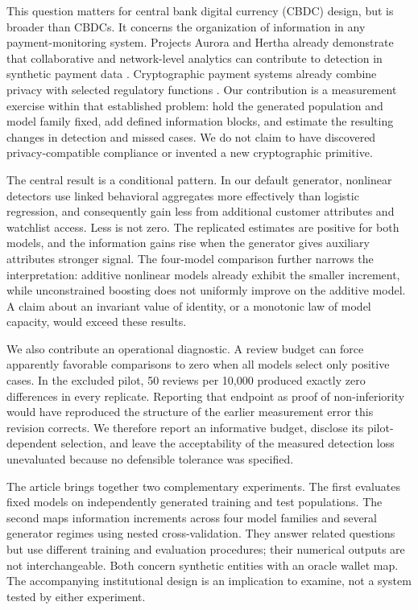 \documentclass[11pt,a4paper]{article}
\begin{document}
This question matters for central bank digital currency (CBDC) design, but is broader than CBDCs. It concerns the organization of information in any payment-monitoring system. Projects Aurora and Hertha already demonstrate that collaborative and network-level analytics can contribute to detection in synthetic payment data \citep{Aurora,Hertha}. Cryptographic payment systems already combine privacy with selected regulatory functions \citep{Platypus,PEReDi,Pools}. Our contribution is a measurement exercise within that established problem: hold the generated population and model family fixed, add defined information blocks, and estimate the resulting changes in detection and missed cases. We do not claim to have discovered privacy-compatible compliance or invented a new cryptographic primitive.

The central result is a conditional pattern. In our default generator, nonlinear detectors use linked behavioral aggregates more effectively than logistic regression, and consequently gain less from additional customer attributes and watchlist access. Less is not zero. The replicated estimates are positive for both models, and the information gains rise when the generator gives auxiliary attributes stronger signal. The four-model comparison further narrows the interpretation: additive nonlinear models already exhibit the smaller increment, while unconstrained boosting does not uniformly improve on the additive model. A claim about an invariant value of identity, or a monotonic law of model capacity, would exceed these results.

We also contribute an operational diagnostic. A review budget can force apparently favorable comparisons to zero when all models select only positive cases. In the excluded pilot, 50 reviews per 10,000 produced exactly zero differences in every replicate. Reporting that endpoint as proof of non-inferiority would have reproduced the structure of the earlier measurement error this revision corrects. We therefore report an informative budget, disclose its pilot-dependent selection, and leave the acceptability of the measured detection loss unevaluated because no defensible tolerance was specified.

The article brings together two complementary experiments. The first evaluates fixed models on independently generated training and test populations. The second maps information increments across four model families and several generator regimes using nested cross-validation. They answer related questions but use different training and evaluation procedures; their numerical outputs are not interchangeable. Both concern synthetic entities with an oracle wallet map. The accompanying institutional design is an implication to examine, not a system tested by either experiment.
\end{document}
